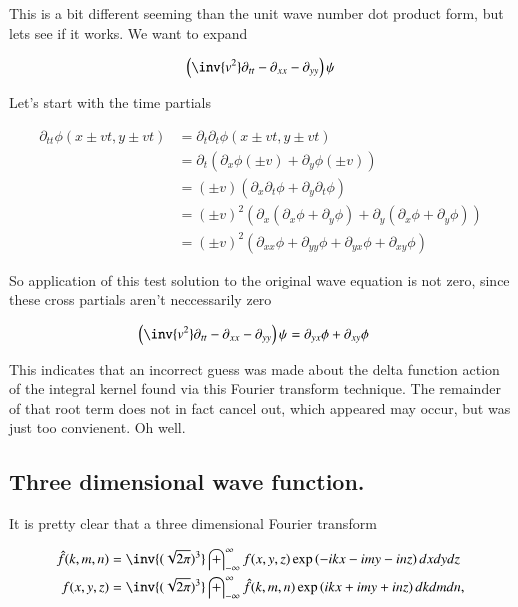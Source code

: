 \documentclass{article}
\newcommand{\IIinf}[0]{ \int_{-\infty}^\infty }
\begin{document}
This is a bit different seeming than the unit wave number dot product form, but lets see if it works.  We want to expand

\begin{align*}
\left(\inv{v^2} \partial_{tt} -\partial_{xx} -\partial_{yy} \right)\psi
\end{align*}

Let's start with the time partials

\begin{align*}
\partial_{tt} \phi( x \pm vt, y \pm vt ) 
&=
\partial_{t} \partial_t \phi( x \pm vt, y \pm vt ) \\
&= \partial_{t} ( \partial_x \phi (\pm v) +\partial_y \phi (\pm v) ) \\
&= (\pm v)( \partial_{x} \partial_t \phi  + \partial_y \partial_t \phi ) \\
&= (\pm v)^2( \partial_{x} (\partial_x \phi + \partial_y \phi)  + \partial_y (\partial_x \phi + \partial_y \phi)) \\
&= (\pm v)^2( \partial_{xx} \phi +\partial_{yy} \phi +\partial_{yx} \phi +\partial_{xy} \phi )
\end{align*}

So application of this test solution to the original wave equation is not zero, since these cross partials aren't neccessarily zero

\begin{align*}
\left(\inv{v^2} \partial_{tt} -\partial_{xx} -\partial_{yy} \right)\psi 
&= \partial_{yx} \phi + \partial_{xy} \phi 
\end{align*}

This indicates that an incorrect guess was made about the delta function action of the integral kernel found 
via this Fourier transform technique.  The remainder of that root term does not in fact cancel out, which appeared may 
occur, but was just too convienent.  Oh well.

\subsection{ Three dimensional wave function. }

It is pretty clear that a three dimensional Fourier transform

\begin{align*}
\hat{f}(k,m,n) &= \inv{(\sqrt{2\pi})^3} \IIinf f(x,y,z) \exp\left( -i k x - i m y - i n z \right) dx dy dz \\
{f}(x,y,z) &= \inv{(\sqrt{2\pi})^3} \IIinf \hat{f}(k,m,n) \exp\left( i k x + i m y + i n z \right) dk dm dn,
\end{align*}
\end{document}
